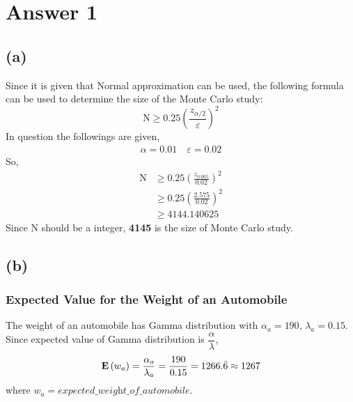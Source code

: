 \section*{Answer 1}

\subsection*{(a)}


Since it is given that Normal approximation can be used, the following formula can be used to determine the size of the Monte Carlo study:
\begin{equation*}
  \mathrm{N} \geq 0.25 \left( \dfrac{z_{\alpha / 2}}{\varepsilon} \right)^2
\end{equation*}
In question the followings are given,
\begin{align*}
  \alpha = 0.01 \quad \varepsilon = 0.02
\end{align*}
So,
\begin{align*}
  \mathrm{N} & \geq 0.25 \left( \frac{z_{0.005}}{0.02} \right)^2 \\
             & \geq 0.25 \left( \frac{2.575}{0.02} \right)^2 \\
             & \geq 4144.140625 
\end{align*}
Since $\mathrm{N}$ should be a integer, \textbf{4145} is the size of Monte Carlo study.


\subsection*{(b)}

\subsubsection*{Expected Value for the Weight of an Automobile}


The weight of an automobile has Gamma distribution with $\alpha_a = 190$, $\lambda_a = 0.15$. Since expected value of Gamma distribution is $\dfrac{\alpha}{\lambda}$,
\begin{equation*}
  \mathbf{E}\left(w_a\right) = \frac{\alpha_a}{\lambda_a} = \frac{190}{0.15} = 1266.\bar{6} \approx 1267
\end{equation*}
where $w_a = \textit{expected\_weight\_of\_automobile}$.

